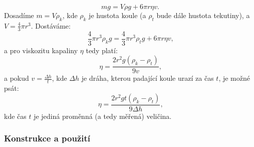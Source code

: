 \documentclass[12pt]{article}
\begin{document}
\begin{equation}
    mg = V\rho g + 6\pi r\eta v\text{.}
\end{equation}
Dosadíme $m = V\rho_k$, kde $\rho_k$ je hustota koule (a $\rho_t$ bude dále hustota tekutiny), a $V = \frac{4}{3}\pi r^3$. Dostáváme:
\begin{equation}
    \frac{4}{3}\pi r^3 \rho_k g = \frac{4}{3}\pi r^3 \rho_t g + 6\pi r\eta v\text{,}
\end{equation}
a pro viskozitu kapaliny $\eta$ tedy platí:~\cite{book:Calibration_of_viscometers}
\begin{equation}
    \eta = \frac{2r^2g(\rho_k-\rho_t)}{9v}\text{,}
\end{equation}
a pokud $v = \frac{\Delta h}{t}$, kde $\Delta h$ je dráha, kterou padající koule urazí za čas $t$, je možné psát:
\begin{equation}
    \eta = \frac{2r^2gt(\rho_k-\rho_t)}{9\Delta h}\text{,}
    \label{eq:kulickovy_viskozimetr}
\end{equation}
kde čas $t$ je jediná proměnná (a tedy měřená) veličina.

\subsubsection{Konstrukce a použití}%
\end{document}
